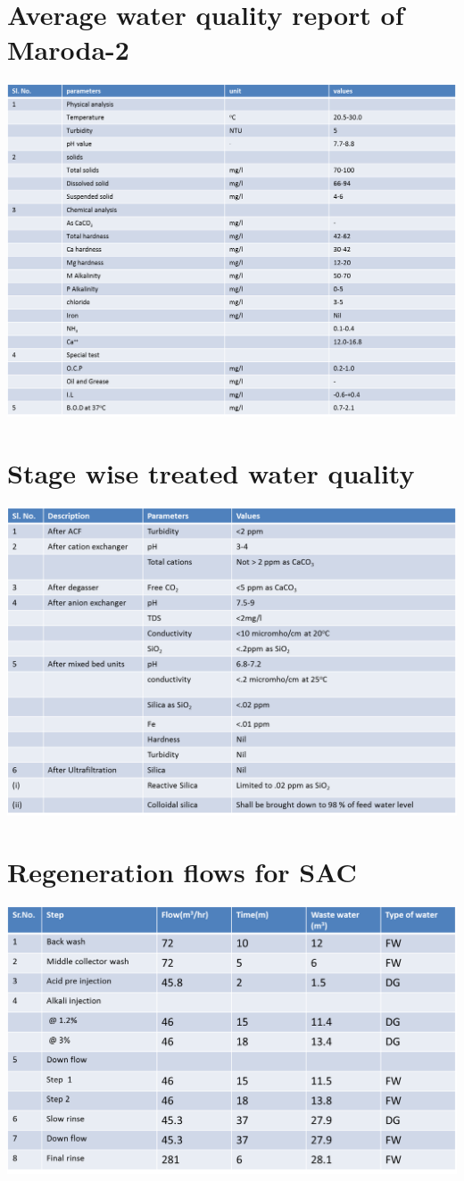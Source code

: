 \documentclass[english,11pt]{report}
\begin{document}
\section{Average water quality report of Maroda-2}
\includegraphics[width = 6in]{dm2.png}
\section{Stage wise treated water quality}
\includegraphics[width = 6in]{dm3.png}
\section{Regeneration flows for SAC}
\includegraphics[width = 6in]{dm4.png}
\end{document}
